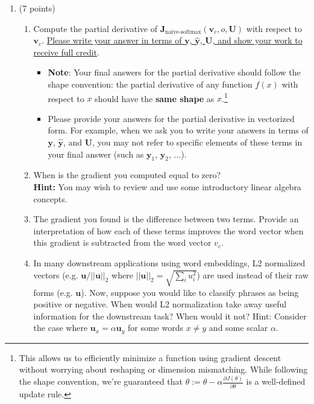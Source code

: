 \documentclass{article}
\begin{document}
\begin{enumerate}[label=(\alph*)]
\item (7 points) 
\begin{enumerate}[label=(\roman*)]
    \item 
    Compute the partial derivative of $\bm J_{\text{naive-softmax}}(\bm v_c, o, \bm U)$ with respect to $\bm v_c$. \ul{Please write your answer in terms of $\bm y$, $\hat{\bm y}$, $\bm U$, and show your work to receive full credit}.
    \begin{itemize} 
        \item \textbf{Note}: Your final answers for the partial derivative should follow the shape convention: the partial derivative of any function $f(x)$ with respect to $x$ should have the \textbf{same shape} as $x$.\footnote{This allows us to efficiently minimize a function using gradient descent without worrying about reshaping or dimension mismatching. While following the shape convention, we're guaranteed that $\theta:= \theta - \alpha\frac{\partial J(\theta)}{\partial \theta}$ is a well-defined update rule.}
        \item Please provide your answers for the partial derivative in vectorized form. For example, when we ask you to write your answers in terms of $\bm y$, $\hat{\bm y}$, and $\bm U$, you may not refer to specific elements of these terms in your final answer (such as $\bm y_1$, $\bm y_2$, $\dots$). 
    \end{itemize}
    \item
    When is the gradient you computed equal to zero? \\
    \textbf{Hint:} You may wish to review and use some introductory linear algebra concepts.
    \item
    The gradient you found is the difference between two terms. Provide an interpretation of how each of these terms improves the word vector when this gradient is subtracted from the word vector $v_c$.
    \item
    In many downstream applications using word embeddings, L2 normalized vectors (e.g. $\mathbf{u}/||\mathbf{u}||_2$ where $||\mathbf{u}||_2 = \sqrt{\sum_i u_i^2}$) are used instead of their raw forms (e.g. $\mathbf{u}$). Now, suppose you would like to classify phrases as being positive or negative. When would L2 normalization take away useful information for the downstream task? When would it not? 
Hint: Consider the case where $\mathbf{u}_x = \alpha\mathbf{u}_y$ for some words $x \neq y$ and some scalar $\alpha$.

\end{enumerate}


\end{enumerate}
\end{document}
